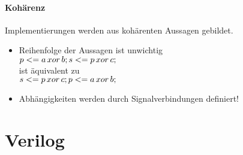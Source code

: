 	\paragraph{Kohärenz}
	Implementierungen werden aus kohärenten Aussagen gebildet.
	\begin{itemize}
		\item Reihenfolge der Aussagen ist unwichtig\\
			\(p <= a\, xor\, b;\\s <= p\, xor\, c;\)\\
			ist äquivalent zu\\
			\(s <= p\, xor\, c;\\p <= a\, xor\, b;\)
		\item Abhängigkeiten werden durch Signalverbindungen definiert!
	\end{itemize}

\section{Verilog}
